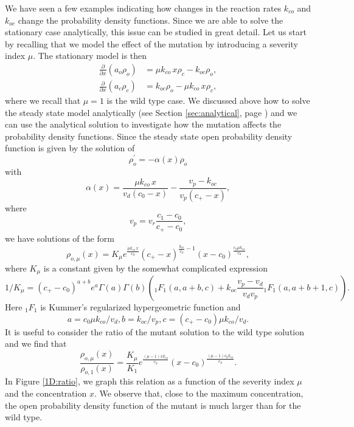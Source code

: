 We have seen a few examples indicating how changes in the reaction rates
$k_{co}$ and $k_{oc}$ change the probability density functions. Since we are
able to solve the stationary case analytically, this issue can be studied in
great detail. Let us start by recalling that we model the effect of the
mutation by introducing a severity index $\mu$. The stationary model is then
\begin{align}
\frac{\partial}{\partial x}\left(  a_{o}\rho_{o}\right)   &  =\mu k_{co}\, x
\rho_{c}-k_{oc}\rho_{o},\label{steadystate11}\\
\frac{\partial}{\partial x}\left(  a_{c}\rho_{c}\right)   &  =k_{oc}\rho
_{o}-\mu k_{co}\, x \rho_{c}, \label{steadystate12}
\end{align}
where we recall that $\mu=1$ is the wild type case. We discussed above how to
solve the steady state model analytically
(see Section \ref{sec:analytical}, page \pageref{sec:analytical}) 
and we can use the analytical
solution to investigate how the mutation affects the probability density
functions. 
Since the steady state open probability density function is given
by the solution of
\[
\rho_{o}^{\prime}=-\alpha(x)\rho_{o}
\]
with
\[
\alpha(x)=\frac{\mu k_{co}\, x}{v_{d}(c_{0}-x)}-\frac{v_{p}-k_{oc}}{v_{p}(c_{+}-x)},
\]
where
\[
v_{p}=v_{r}\frac{c_{1}-c_{0}}{c_{+}-c_{0}},
\]
we have solutions of the form
\begin{equation}
\rho_{o,\mu}(x)=K_{\mu}e^{\frac{\mu k_{co}\,x}{v_{d}}}(c_{+}-x)^{\frac{k_{oc}
}{v_{p}}-1}(x-c_{0})^{\frac{c_{0}\mu k_{co}}{v_{d}}}, \label{rho_o}
\end{equation}
where $K_{\mu}$ is a constant given by the somewhat complicated
expression\thinspace
\[
1/K_{\mu}=(c_{+}-c_{0})^{a+b}e^{a}\Gamma(a)\Gamma(b)({}_{1}\!F_{1}
(a,a+b,c)+k_{oc}\frac{v_{p}-v_{d}}{v_{d}v_{p}}{}_{1}\!F_{1}(a,a+b+1,c)).
\]
Here ${}_{1}\!F_{1}$ is Kummer's regularized hypergeometric function and
\[
a=c_{0}\mu k_{co}/v_{d},b=k_{oc}/v_{p},c=(c_{+}-c_{0})\mu k_{co}/v_{d}.
\] 
It is useful to consider the ratio of the mutant solution to the wild type
solution and we find that
\[
\frac{\rho_{o,\mu}(x)}{\rho_{o,1}(x)}=\frac{K_{\mu}}{K_{1}}e^{\frac{\left(
\mu-1\right)  xk_{co}}{v_{d}}}(x-c_{0})^{\frac{\left(  \mu-1\right)
c_{0}k_{co}}{v_{d}}}.
\]
In Figure \ref{1D:ratio}, we graph this relation as a function of the
severity index $\mu$ and the concentration $x.$ We observe that, close to the
maximum concentration, the open probability density function of the mutant 
is much larger than for the wild type.

